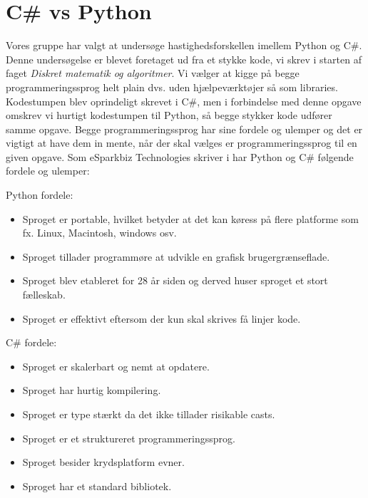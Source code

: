 \documentclass[class=report, crop=false]{standalone}
\begin{document}
    \section{C\# vs Python}
        Vores gruppe har valgt at undersøge hastighedsforskellen imellem Python og C\#. Denne undersøgelse er blevet foretaget ud fra et stykke kode, vi skrev i starten af faget \textit{Diskret matematik og algoritmer}.
        Vi vælger at kigge på begge programmeringssprog helt plain dvs. uden hjælpeværktøjer så som libraries. Kodestumpen blev oprindeligt skrevet i C\#, men i forbindelse med denne opgave omskrev vi hurtigt kodestumpen til Python, så begge stykker kode udfører samme opgave.
        Begge programmeringssprog har sine fordele og ulemper og det er vigtigt at have dem in mente, når der skal vælges er programmeringssprog til en given opgave.
        Som eSparkbiz Technologies skriver i \cite{esparkinfo} har Python og C\# følgende fordele og ulemper:
        \begin{multicols}{2}
        \raggedcolumns
        \begin{tcolorbox}
        \noindent\textcolor{ao(english)}{Python fordele:}
        \begin{itemize}
            \setlength{\itemsep}{0pt}
            \setlength{\parskip}{0pt}
            \item Sproget er portable, hvilket betyder at det kan køress på flere platforme som fx. Linux, Macintosh, windows osv.
            \item Sproget tillader programmøre at udvikle en grafisk brugergrænseflade.
            \item Sproget blev etableret for 28 år siden og derved huser sproget et stort fælleskab.
            \item Sproget er effektivt eftersom der kun skal skrives få linjer kode.
        \end{itemize}
        \end{tcolorbox}
        \columnbreak

        \begin{tcolorbox}
        \noindent\textcolor{ao(english)}{C\# fordele:}
        \begin{itemize}
            \setlength{\itemsep}{0pt}
            \setlength{\parskip}{0pt}
            \item Sproget er skalerbart og nemt at opdatere.
            \item Sproget har hurtig kompilering.
            \item Sproget er type stærkt da det ikke tillader risikable casts.
            \item Sproget er et struktureret programmeringssprog.
            \item Sproget besider krydsplatform evner.
            \item Sproget har et standard bibliotek.
        \end{itemize}
        \end{tcolorbox}
        \end{multicols}
\end{document}
